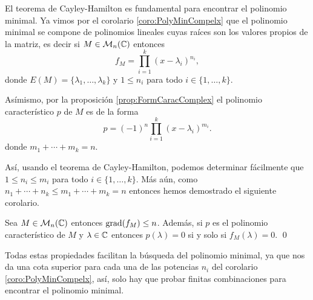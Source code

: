 El teorema de Cayley-Hamilton es fundamental para encontrar el polinomio minimal. Ya vimos por el corolario \ref{coro:PolyMinCompelx} que el polinomio minimal se compone de polinomios lineales cuyas raíces son los valores propios de la matriz, es decir si $M \in \mathcal{M}_n(\mathbb{C})$ entonces
\[
  f_M = \prod_{i=1}^k (x-\lambda_i)^{n_i},
\]
donde $E(M) = \{\lambda_1,\ldots,\lambda_k\}$ y $1 \leq n_i$ para todo $i\in\{1,\ldots,k\}$.

Asímismo, por la proposición \ref{prop:FormCaracComplex} el polinomio característico $p$ de $M$ es de la forma
\[
  p = (-1)^n \prod_{i=1}^k (x-\lambda_i)^{m_i}.
\]
donde $m_1 + \cdots + m_k = n$.

Así, usando el teorema de Cayley-Hamilton, podemos determinar fácilmente que $1 \leq  n_i \leq m_i$ para todo $i\in\{1,\ldots,k\}$. Más aún, como $n_1 + \cdots + n_k \leq m_1 + \cdots + m_k = n$ entonces hemos demostrado el siguiente corolario.

\begin{coro}
  Sea $M \in \mathcal{M}_n(\mathbb{C})$ entonces $\operatorname{grad}(f_M) \leq n$. Además, si $p$ es el polinomio característico de $M$ y $\lambda \in \mathbb{C}$ entonces $p(\lambda) = 0$ si y solo si $f_M(\lambda) = 0$. \qed
\end{coro}

Todas estas propiedades facilitan la búsqueda del polinomio minimal, ya que nos da una cota superior para cada una de las potencias $n_i$ del corolario \ref{coro:PolyMinCompelx}, así, solo hay que probar finitas combinaciones para encontrar el polinomio minimal.


